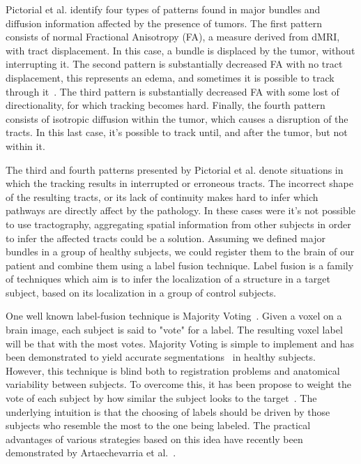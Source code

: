 Pictorial et al.\cite{Pictorial2004} identify four types of patterns found
in major bundles and diffusion information affected by the 
presence of tumors. The first pattern consists of normal Fractional Anisotropy
(FA), a measure derived from dMRI, with tract displacement. In this case, a
bundle is displaced by the tumor, without interrupting it. The second pattern
is substantially decreased FA with no tract displacement, this represents an
edema, and sometimes it is possible to track through it~\cite{Deslauriers-Gauthier2018}.
The third pattern is substantially decreased FA with some lost of directionality,
for which tracking becomes hard. Finally, the fourth pattern consists of
isotropic diffusion within the tumor, which causes a disruption of the tracts.
In this last case, it's possible to track until, and after the tumor, but not
within it.

The third and fourth patterns presented by Pictorial et al.\cite{Pictorial2004}
denote situations in which the tracking results in interrupted or erroneous
tracts. The incorrect shape of the resulting tracts, or its lack of continuity
makes hard to infer which pathways are directly affect by the pathology. In these
cases were it's not possible to use tractography, aggregating spatial information
from other subjects in order to infer the affected tracts could be a solution.
Assuming we defined major bundles in a group of healthy subjects, we could
register them to the brain of our patient and combine them using a label fusion
technique. Label fusion is a family of techniques which aim is to infer the
localization of a structure in a target subject, based on its
localization in a group of control subjects.

One well known label-fusion technique is Majority Voting~\cite{Xu1992}. Given a
voxel on a brain image, each subject is said to "vote" for a label. The resulting
voxel label will be that with the most votes. Majority Voting is simple to
implement and has been demonstrated to yield accurate segmentations~\cite{Asman2013}
in healthy subjects. However, this technique is blind both to registration problems
and anatomical variability between subjects. To overcome this, it has been propose
to weight the vote of each subject by how similar the subject looks to the
target~\cite{Sabuncu2010}. The underlying intuition is that the choosing of labels
should be driven by those subjects who resemble the most to the one being labeled.
The practical advantages of various strategies based on this idea have recently
been demonstrated by Artaechevarria et al.~\cite{Artaechevarria2009}.


